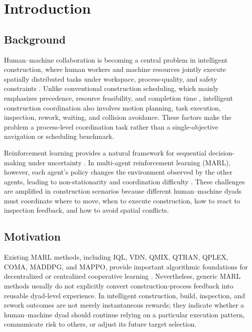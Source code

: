 \documentclass[fleqn,10pt]{wlpeerj}
\begin{document}
\section{Introduction}

\subsection{Background}

Human--machine collaboration is becoming a central problem in intelligent construction, where human workers and machine resources jointly execute spatially distributed tasks under workspace, process-quality, and safety constraints \cite{Bock2015FutureConstructionAutomation,BockLinner2016ConstructionRobots,OesterreichTeuteberg2016DigitisationConstruction,Liang2021HRCConstruction,Zhang2023HRCOnSite}. Unlike conventional construction scheduling, which mainly emphasizes precedence, resource feasibility, and completion time \cite{KolischHartmann1999RCPSP,Hartmann2000HeuristicsRCPSP,HartmannBriskorn2010RCPSPSurvey}, intelligent construction coordination also involves motion planning, task execution, inspection, rework, waiting, and collision avoidance. These factors make the problem a process-level coordination task rather than a single-objective navigation or scheduling benchmark.

Reinforcement learning provides a natural framework for sequential decision-making under uncertainty \cite{SuttonBarto2018RL,Mnih2015DQN,Schulman2017PPO}. In multi-agent reinforcement learning (MARL), however, each agent's policy changes the environment observed by the other agents, leading to non-stationarity and coordination difficulty \cite{Tan1993MARL,Lowe2017MADDPG,Foerster2017StabilisingReplay}. These challenges are amplified in construction scenarios because different human--machine dyads must coordinate where to move, when to execute construction, how to react to inspection feedback, and how to avoid spatial conflicts.

\subsection{Motivation}

Existing MARL methods, including IQL, VDN, QMIX, QTRAN, QPLEX, COMA, MADDPG, and MAPPO, provide important algorithmic foundations for decentralized or centralized cooperative learning \cite{Tan1993MARL,Sunehag2018VDN,Rashid2018QMIX,Son2019QTRAN,Wang2021QPLEX,Foerster2018COMA,Lowe2017MADDPG,Yu2022MAPPO}. Nevertheless, generic MARL methods usually do not explicitly convert construction-process feedback into reusable dyad-level experience. In intelligent construction, build, inspection, and rework outcomes are not merely instantaneous rewards; they indicate whether a human--machine dyad should continue relying on a particular execution pattern, communicate risk to others, or adjust its future target selection.
\end{document}
